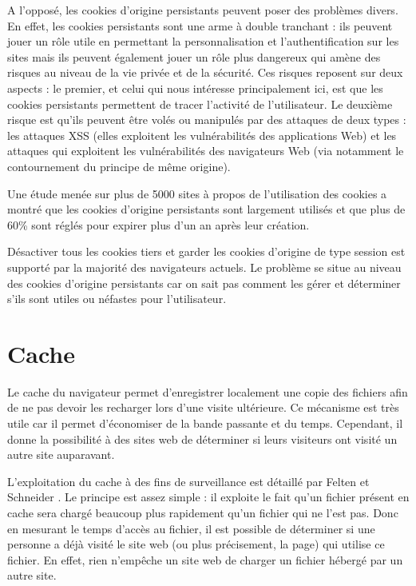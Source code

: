 A l'opposé, les cookies d'origine persistants peuvent poser des problèmes divers. En effet, les cookies persistants sont une arme à double tranchant : ils peuvent jouer un rôle utile en permettant la personnalisation et l'authentification sur les sites mais ils peuvent également jouer un rôle plus dangereux qui amène des risques au niveau de la vie privée et de la sécurité. Ces risques reposent sur deux aspects : le premier, et celui qui nous intéresse principalement ici, est que les cookies persistants permettent de tracer l'activité de l'utilisateur. Le deuxième risque est qu'ils peuvent être volés ou manipulés par des attaques de deux types : les attaques XSS (elles exploitent les vulnérabilités des applications Web) et les attaques qui exploitent les vulnérabilités des navigateurs Web (via notamment le contournement du principe de même origine).
\newline

Une étude menée sur plus de 5000 sites à propos de l'utilisation des cookies \cite{Yue:2007:ACU:1251984.1253093} a montré que les cookies d'origine persistants sont largement utilisés et que plus de 60\% sont réglés pour expirer plus d'un an après leur création.
\newline

Désactiver tous les cookies tiers et garder les cookies d'origine de type session est supporté par la majorité des navigateurs actuels. Le problème se situe au niveau des cookies d'origine persistants car on sait pas comment les gérer et déterminer s'ils sont utiles ou néfastes pour l'utilisateur.


\section{Cache}
\label{cache}
Le cache du navigateur permet d'enregistrer localement une copie des fichiers afin de ne pas devoir les recharger lors d'une visite ultérieure. Ce mécanisme est très utile car il permet d'économiser de la bande passante et du temps. Cependant, il donne la possibilité à des sites web de déterminer si leurs visiteurs ont visité un autre site auparavant.

L'exploitation du cache à des fins de surveillance est détaillé par Felten et Schneider \cite{Felten:2000:TAW:352600.352606}.
Le principe est assez simple : il exploite le fait qu'un fichier présent en cache sera chargé beaucoup plus rapidement qu'un fichier qui ne l'est pas. Donc en mesurant le temps d'accès au fichier, il est possible de déterminer si une personne a déjà visité le site web (ou plus précisement, la page) qui utilise ce fichier. En effet, rien n'empêche un site web de charger un fichier hébergé par un autre site.
\newline

